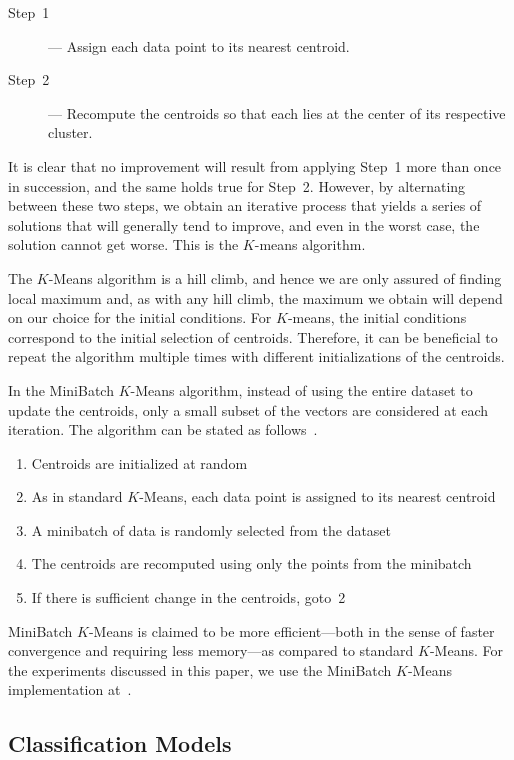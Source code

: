 \documentclass[12pt]{article}
\begin{document}
\begin{description}
\item[Step~1]--- Assign each data point to its nearest centroid.
\item[Step~2]--- Recompute the centroids so that each lies at the center of
its respective cluster.
\end{description}

It is clear that no improvement will result from applying 
Step~1 more than once in succession, and the same holds true for Step~2.
However, by alternating between these two steps, we obtain an iterative process that
yields a series of solutions that will generally tend to improve, and even in the worst
case, the solution cannot get worse. This is the $K$-means algorithm.

The $K$-Means algorithm is a hill climb, and hence we
are only assured of finding local maximum and, as with any hill climb,
the maximum we obtain will depend on our choice for the initial conditions. 
For $K$-means, the initial conditions correspond to the initial selection of centroids.
Therefore, it can be beneficial to repeat the algorithm multiple times with
different initializations of the centroids.

In the MiniBatch $K$-Means algorithm, instead of using the entire dataset to update the centroids, only
a small subset of the vectors are considered at each iteration. The algorithm 
can be stated as follows~\cite{minibatch_k_means}.
\begin{enumerate}
\item Centroids are initialized at random
\item As in standard $K$-Means, each data point is assigned to its nearest centroid
\item A minibatch of data is randomly selected from the dataset
\item The centroids are recomputed using only the points from the minibatch
\item If there is sufficient change in the centroids, goto~2
\end{enumerate}
MiniBatch $K$-Means is claimed to be more efficient---both in the sense of faster convergence
and requiring less memory---as compared to standard $K$-Means.
For the experiments discussed in this paper, we use the MiniBatch $K$-Means implementation 
at~\cite{scikit-learn_mini_batch_kmeans}.

\subsection{Classification Models}
\end{document}
